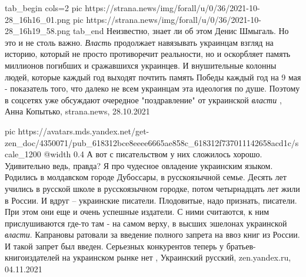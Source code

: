 \ifcmt
tab_begin cols=2
	pic https://strana.news/img/forall/u/0/36/2021-10-28_16h16_01.png
  pic https://strana.news/img/forall/u/0/36/2021-10-28_16h19_58.png
tab_end
\fi
Неизвестно, знает ли об этом Денис Шмыгаль. Но это и не столь важно.
\emph{Власть} продолжает навязывать украинцам взгляд на историю, который не
просто противоречит реальности, но и оскорбляет память миллионов погибших и
сражавшихся украинцев.  И внушительные колонны людей, которые каждый год
выходят почтить память Победы каждый год на 9 мая - показатель того, что далеко
не всем украинцам эта идеология по душе.  Поэтому в соцсетях уже обсуждают
очередное "поздравление" от украинской \emph{власти}
, 
Анна Копытько, strana.news, 28.10.2021

\ifcmt
  pic https://avatars.mds.yandex.net/get-zen_doc/4350071/pub_618312bce8eeee6665ae858c_618312f737011142658acd1c/scale_1200
  @width 0.4
\fi
А вот с писательством у них сложилось хорошо. Удивительно ведь, правда? Я про
чудесное овладение украинским языком. Родились в молдавском городе Дубоссары, в
русскоязычной семье. Десять лет учились в русской школе в русскоязычном
городке, потом четырнадцать лет жили в России. И вдруг – украинские писатели.
Плодовитые, надо признать, писатели.  При этом они еще и очень успешные
издатели. С ними считаются, к ним прислушиваются где-то там - на самом верху, в
высших эшелонах украинской \emph{власти}. Капрановы ратовали за введение
полного запрета на ввоз книг из России.  И такой запрет был введен. Серьезных
конкурентов теперь у братьев-книгоиздателей на украинском рынке нет
, Украинский русский, zen.yandex.ru, 04.11.2021


